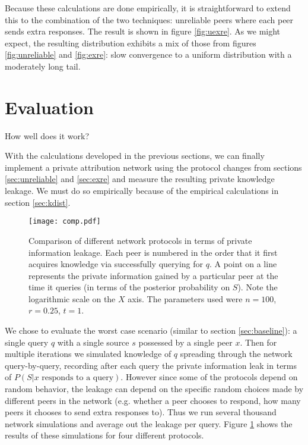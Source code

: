 \documentclass{article}
\newcommand{\secref}[1]{section \ref{sec:#1}}
\newcommand{\figref}[1]{figure \ref{fig:#1}}
\newcommand{\Figref}[1]{Figure \ref{fig:#1}}
\begin{document}
Because these calculations are done empirically, it is straightforward to extend this to
the combination of the two techniques: unreliable peers where each peer sends
extra responses. The result is shown in \figref{uexre}. As we might expect, the
resulting distribution exhibits a mix of those from figures \ref{fig:unreliable}
and \ref{fig:exre}: slow convergence to a uniform distribution with a moderately
long tail.


\section{Evaluation}\label{sec:pan}

How well does it work?

With the calculations developed in the previous sections, we can finally
implement a private attribution network using the protocol changes from sections
\ref{sec:unreliable} and \ref{sec:exre} and measure the resulting private
knowledge leakage. We must do so empirically because of the empirical
calculations in \secref{kdist}.

\begin{figure}%
    \centering
	\texttt{[image: comp.pdf]}
	\caption{Comparison of different network protocols in terms of private
	information leakage. Each peer is numbered in the order that it first
	acquires knowledge via successfully querying for $q$. A point on a line
	represents the private information gained by a particular peer at the time
	it queries (in terms of the posterior probability on $S$). Note the
	logarithmic scale on the $X$ axis. The parameters used were $n=100$,
	$r=0.25$, $t=1$.}
    \label{fig:comp}%
\end{figure}

We chose to evaluate the worst case scenario (similar to \secref{baseline}): a
single query $q$ with a single source $s$ possessed by a single peer $x$. Then
for multiple iterations we simulated knowledge of $q$ spreading through the
network query-by-query, recording after each query the private information leak
in terms of $P(S|\text{$x$ responds to a query})$. However since some of the protocols
depend on random behavior, the leakage can depend on the specific
random choices made by different peers in the network (e.g. whether a peer
chooses to respond, how many peers it chooses to send extra responses to). Thus
we run several thousand network simulations and average out the leakage per
query. \Figref{comp} shows the results of these simulations for four different
protocols.
\end{document}
